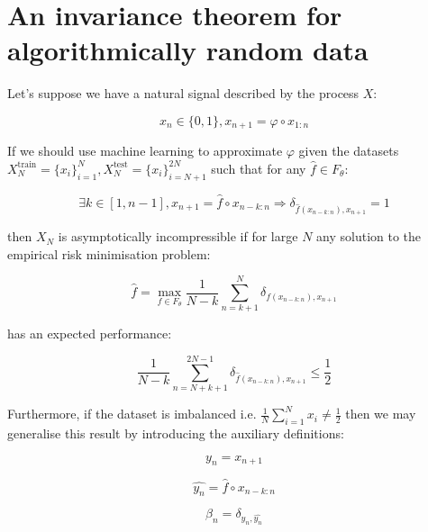 \documentclass{article}
\begin{document}
\newpage 

\appendix

\section{An invariance theorem for algorithmically random data}

Let's suppose we have a natural signal described by the process $X$: 

\begin{equation}
x_n \in \{0,1\}, x_{n+1} = \varphi \circ x_{1:n}	
\end{equation}

If we should use machine learning to approximate $\varphi$ given the datasets 
$X_N^{\text{train}}= \{x_i\}_{i=1}^N,X_N^{\text{test}}= \{x_i\}_{i=N+1}^{2N}$
such that for any $\hat{f} \in F_{\theta}$: 

\begin{equation}
\exists k \in [1,n-1], x_{n+1} = \hat{f} \circ x_{n-k:n} \Rightarrow \delta_{\hat{f}(x_{n-k:n}),x_{n+1}} = 1	
\end{equation}

then $X_N$ is asymptotically incompressible if for large $N$ any solution to the 
empirical risk minimisation problem: 

\begin{equation}
\hat{f} = \max_{f \in F_{\theta}} \frac{1}{N-k} \sum_{n=k+1}^N \delta_{f(x_{n-k:n}),x_{n+1}}
\end{equation}

has an expected performance: 

\begin{equation}
\frac{1}{N-k} \sum_{n=N+k+1}^{2N-1} \delta_{\hat{f}(x_{n-k:n}),x_{n+1}}
 \leq \frac{1}{2}
\end{equation}

Furthermore, if the dataset is imbalanced i.e. $\frac{1}{N} \sum_{i=1}^N x_i \neq \frac{1}{2}$ then we may generalise this result by introducing the auxiliary definitions: 

\begin{equation}
y_n = x_{n+1}	
\end{equation}

\begin{equation}
\hat{y_n} = \hat{f} \circ x_{n-k:n}
\end{equation}

\begin{equation}
\beta_n = \delta_{y_n,\hat{y_n}}	
\end{equation}
\end{document}
